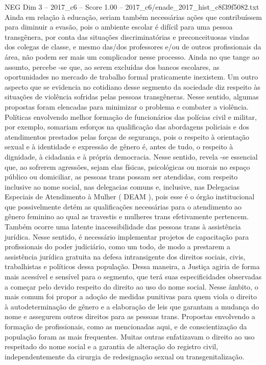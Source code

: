\begin{textsample}{NEG Dim 3 – 2017\_c6 – Score 1.00 – 2017\_c6/enade\_2017\_hist\_c8f39f5082.txt}
Ainda em relação à educação, seriam também necessárias ações que contribuíssem para diminuir a evasão, pois o ambiente escolar é difícil para uma pessoa transgênera, por conta das situações discriminatórias e preconceituosas vindas dos colegas de classe, e mesmo das/dos professores e/ou de outros profissionais da área, não podem ser mais um complicador nesse processo.
Ainda no que tange ao assunto, percebe -se que, ao serem excluídas dos bancos escolares, as oportunidades no mercado de trabalho formal praticamente inexistem.
Um outro aspecto que se evidencia no cotidiano desse segmento da sociedade diz respeito às situações de violência sofridas pelas pessoas transgêneras.
Nesse sentido, algumas propostas foram elencadas para minimizar o problema e combater a violência.
Políticas envolvendo melhor formação de funcionários das polícias civil e militar, por exemplo, somariam esforços na qualificação das abordagens policiais e dos atendimentos prestados pelas forças de segurança, pois o respeito à orientação sexual e à identidade e expressão de gênero é, antes de tudo, o respeito à dignidade, à cidadania e à própria democracia.
Nesse sentido, revela -se essencial que, ao sofrerem agressões, sejam elas físicas, psicológicas ou morais no espaço público ou domiciliar, as pessoas trans possam ser atendidas, com respeito inclusive ao nome social, nas delegacias comuns e, inclusive, nas Delegacias Especiais de Atendimento à Mulher ( DEAM ), pois esse é o órgão institucional que possivelmente detém as qualificações necessárias para o atendimento ao gênero feminino ao qual as travestis e mulheres trans efetivamente pertencem.
Também ocorre uma latente inacessibilidade das pessoas trans à assistência jurídica.
Nesse sentido, é necessário implementar projetos de capacitação para profissionais do poder judiciário, como um todo, de modo a prestarem a assistência jurídica gratuita na defesa intransigente dos direitos sociais, civis, trabalhistas e políticos dessa população.
Dessa maneira, a Justiça agiria de forma mais acessível e sensível para o segmento, que terá suas especificidades observadas a começar pelo devido respeito do direito ao uso do nome social.
Nesse âmbito, o mais comum foi propor a adoção de medidas punitivas para quem viola o direito à autodeterminação de gênero e a elaboração de leis que garantam a mudança do nome e assegurem outros direitos para as pessoas trans.
Propostas envolvendo a formação de profissionais, como as mencionadas aqui, e de conscientização da população foram as mais frequentes.
Muitas outras enfatizavam o direito ao uso respeitado do nome social e a garantia de alteração do registro civil, independentemente da cirurgia de redesignação sexual ou transgenitalização.

\end{textsample}
